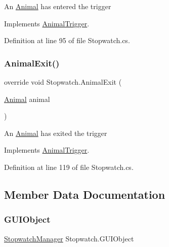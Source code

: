 An \mbox{\hyperlink{class_animal}{Animal}} has entered the trigger 



Implements \mbox{\hyperlink{class_animal_trigger_a03181803fa268e0bfcbdc752ee733c40}{Animal\+Trigger}}.



Definition at line 95 of file Stopwatch.\+cs.

\mbox{\label{class_stopwatch_ad71c492f52e3396c648501c315bae5e5}} 
\subsubsection{\texorpdfstring{Animal\+Exit()}{AnimalExit()}}
{\footnotesize\ttfamily override void Stopwatch.\+Animal\+Exit (\begin{DoxyParamCaption}\item[{\mbox{\hyperlink{class_animal}{Animal}}}]{animal }\end{DoxyParamCaption})\hspace{0.3cm}{\ttfamily [virtual]}}



An \mbox{\hyperlink{class_animal}{Animal}} has exited the trigger 



Implements \mbox{\hyperlink{class_animal_trigger_aa1a7c2e90de76c2e089b2bae01813f5c}{Animal\+Trigger}}.



Definition at line 119 of file Stopwatch.\+cs.



\subsection{Member Data Documentation}
\mbox{\label{class_stopwatch_a5150a5983a590f49e150e9aa1198b581}} 
\subsubsection{\texorpdfstring{G\+U\+I\+Object}{GUIObject}}
{\footnotesize\ttfamily \mbox{\hyperlink{class_stopwatch_manager}{Stopwatch\+Manager}} Stopwatch.\+G\+U\+I\+Object}



